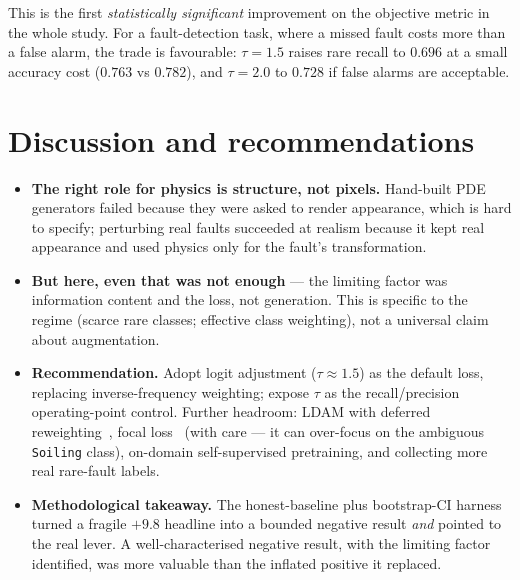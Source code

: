 \documentclass[a4paper]{article}
\begin{document}
This is the first \emph{statistically significant} improvement on the objective
metric in the whole study. For a fault-detection task, where a missed fault costs
more than a false alarm, the trade is favourable: $\tau=1.5$ raises rare recall to
$0.696$ at a small accuracy cost ($0.763$ vs $0.782$), and $\tau=2.0$ to $0.728$
if false alarms are acceptable.

\FloatBarrier
\section{Discussion and recommendations}
\begin{itemize}
  \item \textbf{The right role for physics is structure, not pixels.} Hand-built
        PDE generators failed because they were asked to render appearance, which
        is hard to specify; perturbing real faults succeeded at realism because it
        kept real appearance and used physics only for the fault's transformation.
  \item \textbf{But here, even that was not enough} --- the limiting factor was
        information content and the loss, not generation. This is specific to the
        regime (scarce rare classes; effective class weighting), not a universal
        claim about augmentation.
  \item \textbf{Recommendation.} Adopt logit adjustment ($\tau\approx1.5$) as the
        default loss, replacing inverse-frequency weighting; expose $\tau$ as the
        recall/precision operating-point control. Further headroom:
        LDAM with deferred reweighting~\cite{cao2019ldam}, focal
        loss~\cite{lin2017focal} (with care --- it can over-focus on the
        ambiguous \texttt{Soiling} class), on-domain self-supervised pretraining,
        and collecting more real rare-fault labels.
  \item \textbf{Methodological takeaway.} The honest-baseline plus
        bootstrap-CI harness turned a fragile $+9.8$ headline into a bounded
        negative result \emph{and} pointed to the real lever. A well-characterised
        negative result, with the limiting factor identified, was more valuable
        than the inflated positive it replaced.
\end{itemize}

\printbibliography
\end{document}
